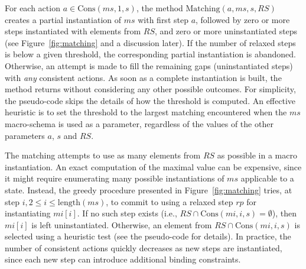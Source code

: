 \documentclass{article}
\begin{document}
For each action $a \in \mbox{Cons}(\textit{ms}, 1, s)$,
the method $\mbox{Matching}(a, \textit{ms}, s, \textit{RS})$ creates a partial instantiation
of $\textit{ms}$ with first step $a$, followed by
zero or more steps instantiated with elements from $\textit{RS}$,
and zero or more uninstantiated steps
(see Figure~\ref{fig:matching} and a discussion later).
If the number of relaxed steps is below a given threshold, 
the corresponding partial instantiation is abandoned.
Otherwise, an attempt is made to fill the remaining gaps (uninstantiated steps)
with \emph{any} consistent actions.
As soon as a complete instantiation is built, the method returns
without considering any other possible outcomes.
For simplicity, the pseudo-code skips the details of how the 
threshold is computed.
An effective heuristic is to set the threshold to the largest matching
encountered when the $\textit{ms}$ macro-schema is used as a parameter,
regardless of the values of the other parameters $a$, $s$ and $\textit{RS}$.

The matching attempts to use as 
many elements from $\textit{RS}$ as possible in a macro instantiation.
An exact computation of the maximal value can be expensive,
since it might require enumerating many possible instantiations of $\textit{ms}$
applicable to a state.
Instead, the greedy procedure presented in Figure~\ref{fig:matching}
tries, at step $i, 2 \leq i \leq \mbox{length}(\textit{ms})$,
to commit to using a
relaxed step $\textit{rp}$ for instantiating $\textit{mi}[i]$.
If no such step exists
(i.e., $\textit{RS} \cap \mbox{Cons}(\textit{mi}, i, s) = \emptyset$), then
$\textit{mi}[i]$ is left uninstantiated.
Otherwise, an element from $\textit{RS} \cap \mbox{Cons}(\textit{mi}, i, s)$
is selected using a heuristic test (see the pseudo-code for details).
In practice, the number of consistent actions quickly
decreases as new steps are instantiated, since each new step
can introduce additional binding constraints.
\end{document}
